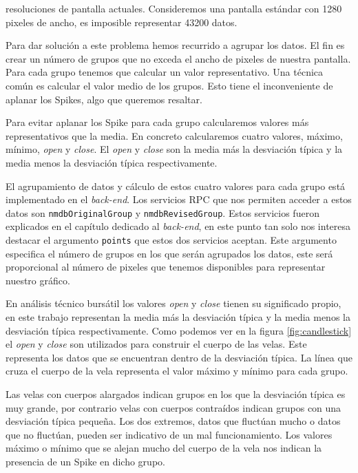 		resoluciones de pantalla actuales. Consideremos una pantalla estándar con 1280 pixeles de ancho, es imposible representar 43200 datos.
		\par
		Para dar solución a este problema hemos recurrido a agrupar los datos. El fin es crear un número de grupos que no exceda el ancho de
		pixeles de nuestra pantalla. Para cada grupo tenemos que calcular un valor representativo. Una técnica común es calcular el valor
		medio de los grupos.  Esto tiene el inconveniente de aplanar los Spikes, algo que queremos resaltar.
		\par
		Para evitar aplanar los Spike para cada grupo calcularemos valores más representativos que la media. En concreto calcularemos cuatro
		valores, máximo, mínimo, \emph{open} y \emph{close}. El \emph{open} y \emph{close} son la media más la desviación típica y la media
		menos la desviación típica respectivamente.
		\par
		El agrupamiento de datos y cálculo de estos cuatro valores para cada grupo está implementado en el \emph{back-end}. Los servicios RPC
		que nos permiten acceder a estos datos son \texttt{nmdbOriginalGroup} y \texttt{nmdbRevisedGroup}. Estos servicios fueron explicados
		en el capítulo dedicado al \emph{back-end}, en este punto tan solo nos interesa destacar el argumento \texttt{points} que estos dos
		servicios aceptan. Este argumento especifica el número de grupos en los que serán agrupados los datos, este será proporcional al
		número de pixeles que tenemos disponibles para representar nuestro gráfico. 
		\par
		En análisis técnico bursátil los valores \emph{open} y \emph{close} tienen su significado propio, en este trabajo representan la media
		más la desviación típica y la media menos la desviación típica respectivamente. Como podemos ver en la figura \ref{fig:candlestick} el
		\emph{open} y \emph{close} son utilizados para construir el cuerpo de las velas. Este representa los datos que se encuentran dentro de
		la desviación típica. La línea que cruza el cuerpo de la vela representa el valor máximo y mínimo para cada grupo.
		\par
		Las velas con cuerpos alargados indican grupos en los que la desviación típica es muy grande, por contrario velas con cuerpos
		contraídos indican grupos con una desviación típica pequeña. Los dos extremos, datos que fluctúan mucho o datos que no fluctúan,
		pueden ser indicativo de un mal funcionamiento. Los valores máximo o mínimo que se alejan mucho del cuerpo de la vela nos indican la
		presencia de un Spike en dicho grupo. 	
